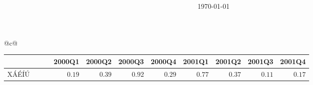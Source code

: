 \documentclass[10pt,letterpaper]{article}
\title{{\mylcmss\bfseries }}
\author{}
\date{\today}
\begin{document}
\pagestyle{myheadings}





\centering


\begin{tabular}[t]{@{\hspace*{-3pt}}c@{ }}
\\[7pt]
{
\renewcommand{\arraystretch}{1.15}
\begin{tabular}{lllrrrrrrrr}
\hline
&&&\multicolumn{1}{c}{{2000Q1}}&\multicolumn{1}{c}{{2000Q2}}&\multicolumn{1}{c}{{2000Q3}}&\multicolumn{1}{c}{{2000Q4}}&\multicolumn{1}{c}{{2001Q1}}&\multicolumn{1}{c}{{2001Q2}}&\multicolumn{1}{c}{{2001Q3}}&\multicolumn{1}{c}{{2001Q4}}\\
\hline
XÁÉÍÚ & ~ &  & {\ensuremath{0.19}} & {\ensuremath{0.39}} & {\ensuremath{0.92}} & {\ensuremath{0.29}} & {\ensuremath{0.77}} & {\ensuremath{0.37}} & {\ensuremath{0.11}} & {\ensuremath{0.17}} \\
\hline
\end{tabular}}
\end{tabular}%
\end{document}
